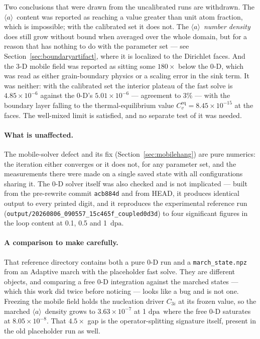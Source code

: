 \documentclass[11pt,a4paper]{article}
\newcommand{\code}[1]{\texttt{\small #1}}
\newcommand{\dpa}{\ensuremath{\mathrm{dpa}}}
\newcommand{\aloop}{\ensuremath{\langle a\rangle}}
\begin{document}
Two conclusions that were drawn from the uncalibrated runs are withdrawn. The
\aloop\ content was reported as reaching a value greater than unit atom
fraction, which is impossible; with the calibrated set it does not. The
\aloop\ \emph{number density} does still grow without bound when averaged over
the whole domain, but for a reason that has nothing to do with the parameter
set --- see Section~\ref{sec:boundaryartifact}, where it is localized to the
Dirichlet faces. And the 3-D mobile field was reported as
sitting some $180\times$ below the 0-D, which was read as either grain-boundary
physics or a scaling error in the sink term. It was neither: with the calibrated
set the interior plateau of the fast solve is $4.85\times10^{-6}$ against the
0-D's $5.01\times10^{-6}$ --- agreement to 3\% --- with the boundary layer
falling to the thermal-equilibrium value $C_v^{\mathrm{eq}}=8.45\times10^{-15}$
at the faces. The well-mixed limit is satisfied, and no separate test of it was
needed.

\paragraph{What is unaffected.} The mobile-solver defect and its fix
(Section~\ref{sec:mobilehang}) are pure numerics: the iteration either converges
or it does not, for any parameter set, and the measurements there were made on a
single saved state with all configurations sharing it. The 0-D solver itself was
also checked and is not implicated --- built from the pre-rewrite commit
\code{acb884d} and from HEAD, it produces identical output to every printed
digit, and it reproduces the experimental reference run
(\code{output/20260806\_090557\_15c465f\_coupled0d3d}) to four significant
figures in the loop content at 0.1, 0.5 and 1~\dpa.

\paragraph{A comparison to make carefully.} That reference directory contains
both a pure 0-D run and a \code{march\_state.npz} from an Adaptive march with the
placeholder fast solve. They are different objects, and comparing a free 0-D
integration against the marched states --- which this work did twice before
noticing --- looks like a bug and is not one. Freezing the mobile field holds
the nucleation driver $C_{3i}$ at its frozen value, so the marched \aloop\
density grows to $3.63\times10^{-7}$ at 1 \dpa\ where the free 0-D saturates at
$8.05\times10^{-8}$. That $4.5\times$ gap is the operator-splitting signature
itself, present in the old placeholder run as well.
\end{document}
